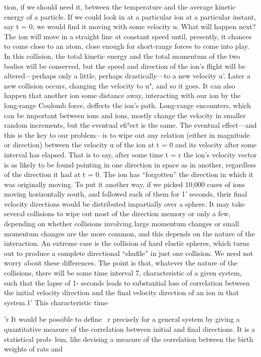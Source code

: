 tion, if we should need it, between the temperature and the average
kinetic energy of a particle. If we could look in at a particular ion
at a particular instant, say t = 0, we would find it moving with some
velocity u. What will happen next? The ion will move in a straight
line at constant speed until, presently, it chances to come close to an
atom, close enough for short-range forces to come into play. In this
collision, the total kinetic energy and the total momentum of the two
bodies will be conserved, but the speed and direction of the ion's
ffight will be altered---perhaps only a little, perhaps drastically---to
a new velocity u'. Later a new collision occurs, changing the velocity
to u", and so it goes. It can also happen that another ion some distance
away, interacting with our ion by the long-range Coulomb
force, deffects the ion's path. Long-range encounters, which can be
important between ions and ions, mostly change the velocity in
smaller random increments, but the eventual efi°ect is the same.
The eventual effect---and this is the key to our problem---is to wipe
out any relation (either in magnitude or direction) between the
velocity u of the ion at t = 0 and its velocity after some interval has
elapsed. That is to say, after some time t = r the ion's velocity vector
is as likely to be found pointing in one direction in space as in
another, regardless of the direction it had at t = 0. The ion has
``forgotten'' the direction in which it was originally moving. To put
it another way, if we picked 10,000 cases of ions moving horizontally
south, and followed each of them for 1' seconds, their final velocity
directions would be distributed impartially over a sphere. It may
take several collisions to wipe out most of the direction memory or
only a few, depending on whether collisions involving large momentum
changes or small momentum changes are the more common,
and this depends on the nature of the interaction. An extreme case
is the collision of hard elastic spheres, which turns out to produce a
complete directional ``shufile'' in just one collision. We need not
worry about these differences. The point is that, whatever the nature
of the collisions, there will be some time interval 7, characteristic of
a given system, such that the lapse of 1- seconds leads to substantial
loss of correlation between the initial velocity direction and the final
velocity direction of an ion in that system.1' This characteristic time

'r It would be possible to define ~r precisely for a general system by giving a quantitative
measure of the correlation between initial and final directions. It is a statistical prob-
lem, like devising a measure of the correlation between the birth weights of rats and

